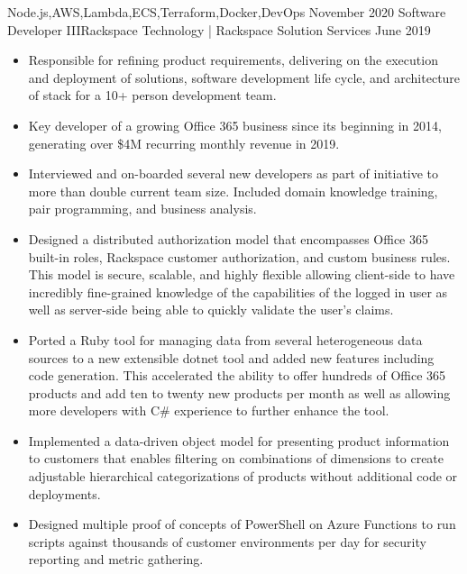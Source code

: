 \begin{experiences}
{\begin{itemize}
                      \end{itemize}
                    }
                    {Node.js,AWS,Lambda,ECS,Terraform,Docker,DevOps}
  \emptySeparator
  \experience
    {November 2020} {Software Developer III}{Rackspace Technology | Rackspace Solution Services}
    {June 2019}     {
                      \begin{itemize}
                        \item Responsible for refining product requirements, delivering on the execution and deployment of solutions, software development life cycle, and architecture of stack for a 10+ person development team.
                        \item Key developer of a growing Office 365 business since its beginning in 2014, generating over \$4M recurring monthly revenue in 2019.
                        \item Interviewed and on-boarded several new developers as part of initiative to more than double current team size. Included domain knowledge training, pair programming, and business analysis.
                        \item Designed a distributed authorization model that encompasses Office 365 built-in roles, Rackspace customer authorization, and custom business rules. This model is secure, scalable, and highly flexible allowing client-side to have incredibly fine-grained knowledge of the capabilities of the logged in user as well as server-side being able to quickly validate the user's claims.
                        \ifcv
                        \item Ported a Ruby tool for managing data from several heterogeneous data sources to a new extensible dotnet tool and added new features including code generation. This accelerated the ability to offer hundreds of Office 365 products and add ten to twenty new products per month as well as allowing more developers with C\# experience to further enhance the tool.
                        \item Implemented a data-driven object model for presenting product information to customers that enables filtering on combinations of dimensions to create adjustable hierarchical categorizations of products without additional code or deployments.
                        \item Designed multiple proof of concepts of PowerShell on Azure Functions to run scripts against thousands of customer environments per day for security reporting and metric gathering.
                        \fi

\end{itemize}}
\end{experiences}
